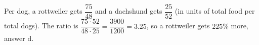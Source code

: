 Per dog, a rottweiler gets $\dfrac{75}{48}$ and a dachshund gets $\dfrac{25}{52}$ (in units of total food per total dogs). The ratio is $\dfrac{75\cdot52}{48\cdot25}=\dfrac{3900}{1200}=3.25$, so a rottweiler gets $225\%$ more, answer $\boxed{\text{d}}$.
